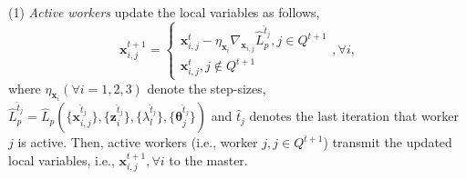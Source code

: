 \documentclass[letterpaper]{article} %
\begin{document}
\noindent (1) \emph{Active} \emph{workers} update the local variables as follows,
\begin{equation}
\label{eq:update_x1_asyn}
{\boldsymbol{x}_{i,j}^{t+1}} = \left\{ \begin{array}{l}
{\boldsymbol{x}_{i,j}^{t}} - \eta_{\boldsymbol{x}_i} \nabla_{\!\boldsymbol{x}_{i,j}} \widehat{L}_p^{\hat{t}_j}, j\in Q^{t+1}\\
{\boldsymbol{x}_{i,j}^{t}}, j\notin Q^{t+1}
\end{array} \right., \forall i,
\end{equation}
where $\eta_{\boldsymbol{x}_i} (\forall i=1,2,3)$ denote the step-sizes, $\widehat{L}_p^{\hat{t}_j} = \widehat{L}_p(\{{\boldsymbol{x}_{i,j}^{\hat{t}_j}}\} ,\!\{{\boldsymbol{z}_i^{\hat{t}_j}}\}, \!\{\lambda_l^{\hat{t}_j}\}, \!\{\boldsymbol{\theta}_j^{\hat{t}_j}\} )$ and ${\hat{t}_j}$ denotes the last iteration that worker $j$ is active. Then, active workers (i.e., worker $j, j\in Q^{t+1}$) transmit the updated local variables, i.e., $\boldsymbol{x}_{i,j}^{t+1}, \forall i$ to the master.
\end{document}
